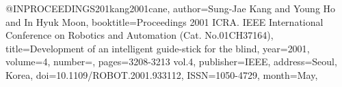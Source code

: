 @INPROCEEDINGS{201kang2001cane,
author={Sung-Jae Kang and Young Ho and In Hyuk Moon},
booktitle={Proceedings 2001 ICRA. IEEE International Conference on Robotics and Automation (Cat. No.01CH37164)}, 
title={Development of an intelligent guide-stick for the blind}, 
year={2001},
volume={4},
number={},
pages={3208-3213 vol.4},
publisher={IEEE},
address={Seoul, Korea},
doi={10.1109/ROBOT.2001.933112},
ISSN={1050-4729},
month={May},}